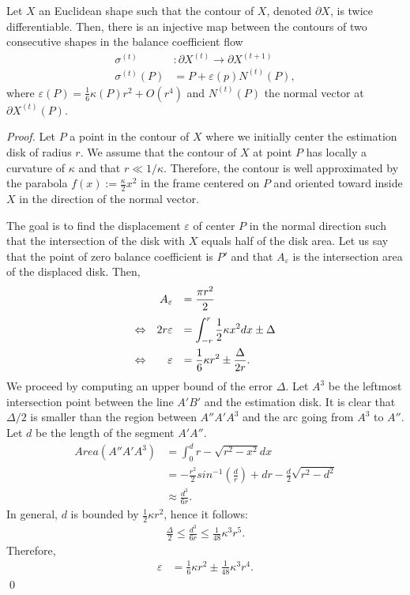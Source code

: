 \documentclass[smallextended]{svjour3}
\begin{document}
%
%
\begin{proposition}\label{prop:balance-coefficient-curve-shortening-flow}
Let $X$ an Euclidean shape such that the contour of $X$, denoted $\partial X$, is twice differentiable. Then, there is an injective map between the contours of two consecutive shapes in the balance coefficient flow
%
%
\begin{align*}
	\sigma^{(t)} &: \partial X^{(t)} \rightarrow \partial X^{(t+1)} \\	
    \sigma^{(t)}(P) &= P + \varepsilon(p)N^{(t)}(P),
\end{align*}
%
%
where $\varepsilon(P)=\frac{1}{6}\kappa(P)r^2 + O(r^4)$ and $N^{(t)}(P)$ the normal vector at $\partial X^{(t)}(P)$.
\end{proposition}
%
%
\begin{proof}
	Let $P$ a point in the contour of $X$ where we initially center the estimation disk of radius $r$. We assume that the contour of $X$ at point $P$ has locally a curvature of $\kappa$ and that $r \ll 1/\kappa$. Therefore, the contour is well approximated by the parabola $f(x) := \frac{\kappa}{2}x^2$ in the frame centered on $P$ and oriented toward inside $X$ in the direction of the normal vector. 
	
	 The goal is to find the displacement $\varepsilon$ of center $P$ in the normal direction such that the intersection of the disk with $X$ equals half of the disk area. Let us say that the point of zero balance coefficient is $P'$ and that $A_{\varepsilon}$ is the intersection area of the displaced disk. Then,
%
%
\[
\begin{array}{>{\displaystyle}r>{\displaystyle}r>{\displaystyle}l}
	& A_{\varepsilon} &= \frac{\pi r ^2}{2} \\[1em] 
	\Leftrightarrow & 2r\varepsilon &= \int_{-r}^{r}{\frac{1}{2}\kappa x^2dx} \pm \Delta \\[1em]
	\Leftrightarrow & \varepsilon &= \frac{1}{6}\kappa r^2 \pm \frac{\Delta}{2r}.
\end{array}
\]
%
%
We proceed by computing an upper bound of the error $\Delta$. Let $A^3$ be the leftmost intersection point between the line $A'B'$ and the estimation disk. It is clear that $\Delta/2$ is smaller than the region between $A''A'A^3$ and the arc going from $A^3$ to $A''$. Let $d$ be the length of the segment $A'A''$. 
%
%
\begin{align*}
	Area(A''A'A^3) &= \int_0^d{r - \sqrt{r^2 - x^2} dx} \\
				   &= -\frac{r^2}{2}sin^{-1}\left(\frac{d}{r}\right) + dr - \frac{d}{2}\sqrt{r^2-d^2} \\
				   &\approx \frac{d^3}{6r}.
\end{align*}
%
%
In general, $d$ is bounded by $\frac{1}{2}\kappa r^2$, hence it follows:
%
%
\begin{align*}
	\frac{\Delta}{2} \leq \frac{d^3}{6r} \leq \frac{1}{48}\kappa^3r^5.
\end{align*}
%
%
Therefore,
%
%
\begin{align*}
	\varepsilon &= \frac{1}{6}\kappa r^2 \pm \frac{1}{48}\kappa^3r^4.
\end{align*}
%
%
\qed
\end{proof}
\end{document}
